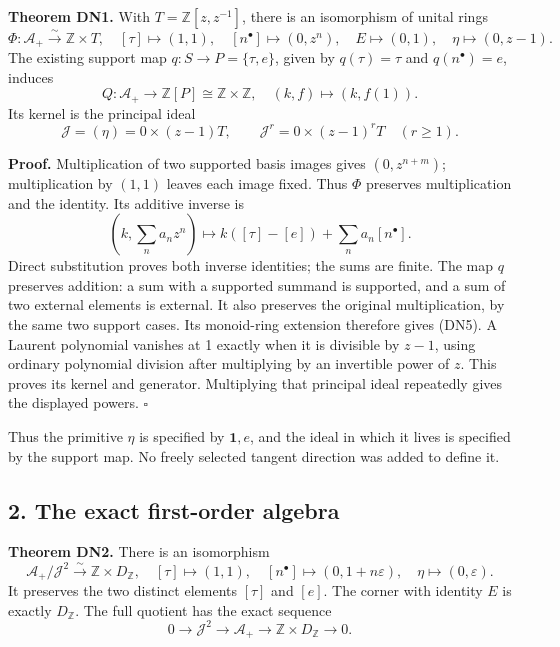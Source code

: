 \documentclass[
]{article}
\begin{document}
\textbf{Theorem DN1.} With \(T=\mathbb Z[z,z^{-1}]\), there is an
isomorphism of unital rings \[
\Phi:\mathcal A_+\xrightarrow{\sim}\mathbb Z\times T,
\quad[\tau]\mapsto(1,1),\quad[n^\bullet]\mapsto(0,z^n),
\quad E\mapsto(0,1),\quad\eta\mapsto(0,z-1).
\tag{DN4}
\] The existing support map \(q:S\to P=\{\tau,e\}\), given by
\(q(\tau)=\tau\) and \(q(n^\bullet)=e\), induces \[
Q:\mathcal A_+\longrightarrow\mathbb Z[P]\cong\mathbb Z\times\mathbb Z,
\quad(k,f)\longmapsto(k,f(1)).
\tag{DN5}
\] Its kernel is the principal ideal \[
\mathcal J=(\eta)=0\times(z-1)T,
\qquad\mathcal J^r=0\times(z-1)^rT\quad(r\ge1).
\tag{DN6}
\]

\textbf{Proof.} Multiplication of two supported basis images gives
\((0,z^{n+m})\); multiplication by \((1,1)\) leaves each image fixed.
Thus \(\Phi\) preserves multiplication and the identity. Its additive
inverse is \[
(k,\textstyle\sum_n a_nz^n)\longmapsto
k([\tau]-[e])+\sum_n a_n[n^\bullet].
\] Direct substitution proves both inverse identities; the sums are
finite. The map \(q\) preserves addition: a sum with a supported summand
is supported, and a sum of two external elements is external. It also
preserves the original multiplication, by the same two support cases.
Its monoid-ring extension therefore gives (DN5). A Laurent polynomial
vanishes at 1 exactly when it is divisible by \(z-1\), using ordinary
polynomial division after multiplying by an invertible power of \(z\).
This proves its kernel and generator. Multiplying that principal ideal
repeatedly gives the displayed powers. \(\square\)

Thus the primitive \(\eta\) is specified by \(\mathbf1,e\), and the
ideal in which it lives is specified by the support map. No freely
selected tangent direction was added to define it.

\subsection{2. The exact first-order
algebra}\label{the-exact-first-order-algebra}

\textbf{Theorem DN2.} There is an isomorphism \[
\mathcal A_+/\mathcal J^2\xrightarrow{\sim}\mathbb Z\times D_{\mathbb Z},
\quad[\tau]\mapsto(1,1),\quad
[n^\bullet]\mapsto(0,1+n\varepsilon),\quad
\eta\mapsto(0,\varepsilon).
\tag{DN7}
\] It preserves the two distinct elements \([\tau]\) and \([e]\). The
corner with identity \(E\) is exactly \(D_{\mathbb Z}\). The full
quotient has the exact sequence \[
0\longrightarrow\mathcal J^2\longrightarrow\mathcal A_+
\longrightarrow\mathbb Z\times D_{\mathbb Z}\longrightarrow0.
\tag{DN8}
\]
\end{document}
